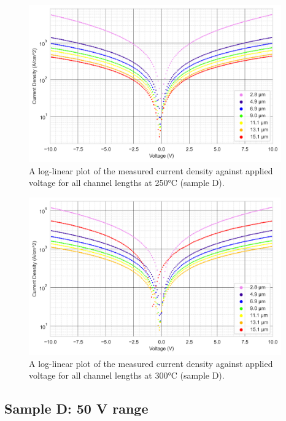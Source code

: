 \begin{figure}[h]
    \centering
    \includegraphics[width=0.97\textwidth]{Chapter3/Figs/Raster/Sample D 2019/10V_Current_Density_vs_Voltage_Temperature_250_log.png}
    \caption{A log-linear plot of the measured current density against applied voltage for all channel lengths at 250\si{\degreeCelsius} (sample D).}
    \label{appfig:10V_D_current_density_250}
\end{figure}
\begin{figure}[h]
    \centering
    \includegraphics[width=0.97\textwidth]{Chapter3/Figs/Raster/Sample D 2019/10V_Current_Density_vs_Voltage_Temperature_300_log.png}
    \caption{A log-linear plot of the measured current density against applied voltage for all channel lengths at 300\si{\degreeCelsius} (sample D).}
    \label{appfig:10V_D_current_density_300}
\end{figure}

\subsection{Sample D: 50 \si{\volt} range}

